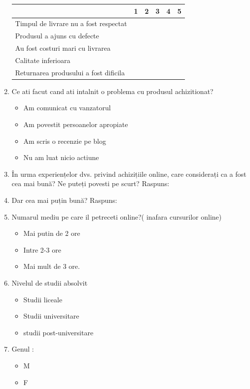 \documentclass[a4paper, 12pt]{article}
\begin{document}
\begin{enumerate}
\begin{center}
		\begin{tabular}{ | m{19em} | m{1cm}| m{1cm} | m{1cm}| m{1cm} | m{1cm} |} 
			\hline
			& 1 & 2 & 3 & 4 & 5\\ 
			\hline
			Timpul de livrare nu a fost respectat  &  &  &  & & \\ 
			\hline
			Produsul a ajuns cu defecte &  &   &  &  &\\ 
			\hline
			Au fost costuri mari cu livrarea &  &   &  & & \\ 
			\hline
			Calitate inferioara&  &  &  & & \\ 
			\hline
			Returnarea produsului a fost dificila &  &  &  & & \\
			\hline
		\end{tabular}
	\end{center}
	\item Ce ati facut cand ati intalnit o problema cu produsul achizitionat?
	\begin{itemize}
		\item Am comunicat cu vanzatorul
		\item Am povestit persoanelor apropiate
		\item Am scris o recenzie pe blog
		\item Nu am luat nicio actiune
	\end{itemize}
	\item În urma experiențelor dvs.  privind achizițiile online, care considerați ca a fost cea mai bună? Ne puteți povesti pe scurt?
	\newline Raspuns: 
	\item Dar cea mai puțin bună?
	\newline Raspuns:
	\item	Numarul mediu pe care il petreceti online?( inafara cursurilor online) 
	\begin{itemize}
		\item Mai putin de 2 ore
		\item Intre 2-3 ore
		\item Mai mult de 3 ore.
	\end{itemize}
	\item 	Nivelul de studii absolvit
	\begin{itemize}
		\item Studii liceale
		\item Studii universitare
		\item studii post-universitare
	\end{itemize}
	\item 	Genul :
	\begin{itemize}
		\item M
		\item F
	\end{itemize} 
\end{enumerate}
\end{document}
